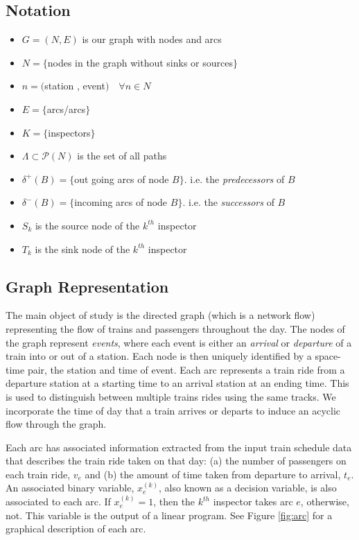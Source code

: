 \documentclass[11pt]{article}
\begin{document}
\subsection{Notation}
\begin{itemize}\itemsep -2pt
    \item $G = (N,E)$ is our graph with nodes and arcs
    \item $N = \{$nodes in the graph without sinks or sources$\}$
    \item $n = ($station , event$)\quad \forall n\in N$
    \item $E = \{$arcs/arcs$\}$
    \item $K = \{$inspectors$\}$
    \item $\Lambda\subset\mathcal{P}(N)$ is the set of all paths
    \item $\delta^+(B) = \{$out going arcs of node $B\}$. i.e. the \textit{predecessors} of $B$
    \item $\delta^-(B) = \{$incoming arcs of node $B\}$. i.e. the \textit{successors} of $B$
    \item $S_k$ is the source node of the $k^{th}$ inspector
    \item $T_k$ is the sink node of the $k^{th}$ inspector
\end{itemize}





\subsection{Graph Representation}

The main object of study is the directed graph (which is a network flow) representing the flow of trains and passengers throughout the day. 
The nodes of the graph represent \textit{events}, where each event is either an \textit{arrival} or \textit{departure} of a train into or out of a station. Each node is then uniquely identified by a space-time pair, the station and time of event. 
Each arc represents a train ride from a departure station at a starting time to an arrival station at an ending time. This is used to distinguish between multiple trains rides using the same tracks. We incorporate the time of day that a train arrives or departs to induce an acyclic flow through the graph. 

Each arc has associated information extracted from the input train schedule data that describes the train ride taken on that day: (a) the number of passengers on each train ride, $v_e$ and (b) the amount of time taken from departure to arrival, $t_e$. An associated binary variable, $x_e^{(k)}$, also known as a decision variable, is also associated to each arc. If $x_e^{(k)} = 1$, then the $k^{th}$ inspector takes arc $e$, otherwise, not. This variable is the output of a linear program. See Figure \ref{fig:arc} for a graphical description of each arc.
\end{document}
